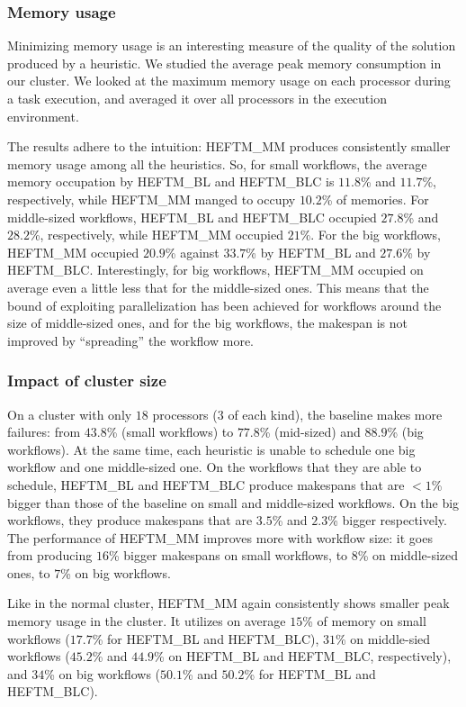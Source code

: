 \documentclass[conference]{IEEEtran}
\newcommand{\algo}[1]{\textsc{#1}}
\newcommand{\heftmm}{\algo{HEFTM\_MM}\xspace}
\newcommand{\heftbl}{\algo{HEFTM\_BL}\xspace}
\newcommand{\heftblc}{\algo{HEFTM\_BLC}\xspace}
\begin{document}
    \subsubsection{Memory usage}
    Minimizing memory usage is an interesting measure of the quality of the solution produced by a heuristic.
    We studied the average peak memory consumption in our cluster.
    We looked at the maximum memory usage on each processor during a task execution, and averaged it over all processors
    in the execution environment.

    The results adhere to the intuition: \heftmm produces consistently smaller memory usage among all the heuristics.
    So, for small workflows, the average memory occupation by \heftbl and \heftblc is $11.8$\% and $11.7$\%, respectively,
    while \heftmm manged to occupy $10.2$\% of memories.
    For middle-sized workflows, \heftbl and \heftblc occupied $27.8$\% and $28.2$\%, respectively, while \heftmm occupied
    $21$\%.
    For the big workflows, \heftmm occupied $20.9$\% against $33.7$\% by \heftbl and $27.6$\% by \heftblc.
    Interestingly, for big workflows, \heftmm occupied on average even a little less that for the middle-sized ones.
    This means that the bound of exploiting parallelization has been achieved for workflows around the size of middle-sized ones,
    and for the big workflows, the makespan is not improved by ``spreading'' the workflow more.

    \subsubsection{Impact of cluster size}
    On a cluster with only $18$ processors ($3$ of each kind), the baseline makes more failures: from $43.8$\%  (small workflows)
    to $77.8$\% (mid-sized) and $88.9$\% (big workflows).
    At the same time, each heuristic is unable to schedule one big workflow and one middle-sized one.
    On the workflows that they are able to schedule, \heftbl and \heftblc produce makespans that are $<1$\% bigger than
    those of the baseline on small and middle-sized workflows.
    On the big workflows, they produce makespans that are $3.5$\% and $2.3$\% bigger respectively.
    The performance of \heftmm improves more with workflow size: it goes from producing $16$\% bigger makespans on small
    workflows, to $8$\% on middle-sized ones, to $7$\% on big workflows.

   Like in the normal cluster, \heftmm again consistently shows smaller peak memory usage in the cluster.
    It utilizes on average $15$\% of memory on small workflows ($17.7$\% for \heftbl and \heftblc),
    $31$\% on middle-sied workflows ($45.2$\% and $44.9$\% on \heftbl and \heftblc, respectively),
    and $34$\% on big workflows ($50.1$\% and $50.2$\% for \heftbl and \heftblc).
\end{document}
